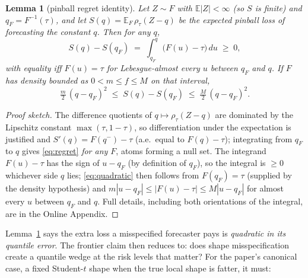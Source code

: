 \documentclass[11pt]{article}
\newtheorem{lemma}{Lemma}
\theoremstyle{remark}
\begin{document}
\begin{lemma}[pinball regret identity]\label{lem:regret}
Let $Z \sim F$ with $\mathbb{E}|Z| < \infty$ (so $S$ is finite) and
$q_F = F^{-1}(\tau)$, and let
$S(q) = \mathbb{E}_F\,\rho_\tau(Z - q)$ be the expected pinball loss of
forecasting the constant $q$. Then for any $q$,
\begin{equation}
S(q) - S(q_F) \;=\; \int_{q_F}^{q} \big(F(u) - \tau\big)\,du \;\ge\; 0,
\label{eq:regret}
\end{equation}
with equality iff $F(u) = \tau$ for Lebesgue-almost every $u$ between $q_F$ and $q$.
If $F$ has density bounded as $0 < m \le f \le M$ on that interval,
\begin{equation}
\tfrac{m}{2}\,(q - q_F)^2 \;\le\; S(q) - S(q_F) \;\le\;
\tfrac{M}{2}\,(q - q_F)^2 .
\label{eq:quadratic}
\end{equation}
\end{lemma}
\begin{proof}[Proof sketch]
The difference quotients of $q\mapsto\rho_\tau(Z-q)$ are dominated by
the Lipschitz constant $\max(\tau,1-\tau)$, so differentiation under the
expectation is justified and $S'(q)=F(q^-)-\tau$ (a.e.\ equal to
$F(q)-\tau$); integrating from $q_F$ to $q$ gives \eqref{eq:regret}
\emph{for any $F$}, atoms forming a null set. The integrand
$F(u)-\tau$ has the sign of $u-q_F$ (by definition of $q_F$), so the
integral is $\ge 0$ whichever side $q$ lies; \eqref{eq:quadratic} then
follows from $F(q_F)=\tau$ (supplied by the density hypothesis) and
$m|u-q_F|\le |F(u)-\tau|\le M|u-q_F|$ for almost every $u$ between
$q_F$ and $q$. Full details, including both
orientations of the integral, are in the Online Appendix.
\end{proof}

Lemma~\ref{lem:regret} says the extra loss a misspecified forecaster
pays is \emph{quadratic in its quantile error}. The frontier claim then
reduces to: does shape misspecification create a quantile wedge at the
risk levels that matter? For the paper's canonical case, a fixed Student-$t$ shape when the true local shape is fatter, it must:
\end{document}
